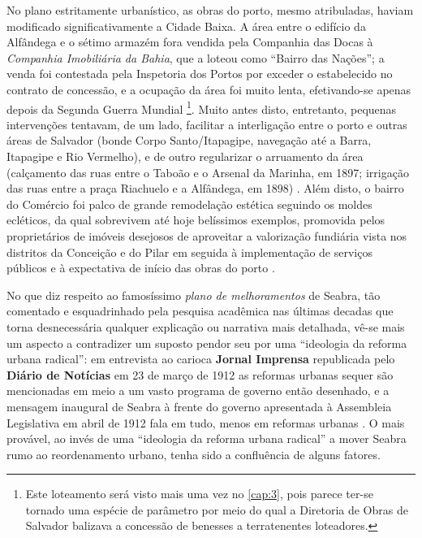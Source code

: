 No plano estritamente urbanístico, as obras do porto, mesmo atribuladas, haviam modificado significativamente a Cidade Baixa. A área entre o edifício da Alfândega e o sétimo armazém fora vendida pela Companhia das Docas à \textit{Companhia Imobiliária da Bahia}, que a loteou como ``Bairro das Nações''; a venda foi contestada pela Inspetoria dos Portos por exceder o estabelecido no contrato de concessão, e a ocupação da área foi muito lenta, efetivando-se apenas depois da Segunda Guerra Mundial \cite[p.~205-206]{almeida_vitrinescomercio_2014}\footnote{Este loteamento será visto mais uma vez no \autoref{cap:3}, pois parece ter-se tornado uma espécie de parâmetro por meio do qual a Diretoria de Obras de Salvador balizava a concessão de benesses a terratenentes loteadores.}. Muito antes disto, entretanto, pequenas intervenções tentavam, de um lado, facilitar a interligação entre o porto e outras áreas de Salvador (bonde Corpo Santo/Itapagipe, navegação até a Barra, Itapagipe e Rio Vermelho), e de outro regularizar o arruamento da área (calçamento das ruas entre o Taboão e o Arsenal da Marinha, em 1897; irrigação das ruas entre a praça Riachuelo e a Alfândega, em 1898) \cite[p.~208-209]{almeida_vitrinescomercio_2014}. Além disto, o bairro do Comércio foi palco de grande remodelação estética seguindo os moldes ecléticos, da qual sobrevivem até hoje belíssimos exemplos, promovida pelos proprietários de imóveis desejosos de aproveitar a valorização fundiária vista nos distritos da Conceição e do Pilar em seguida à implementação de serviços públicos e à expectativa de início das obras do porto \cite[p.~251-304]{almeida_vitrinescomercio_2014}.

No que diz respeito ao famosíssimo \textit{plano de melhoramentos} de Seabra, tão comentado e esquadrinhado pela pesquisa acadêmica nas últimas decadas que torna desnecessária qualquer explicação ou narrativa mais detalhada, vê-se mais um aspecto a contradizer um suposto pendor seu por uma ``ideologia da reforma urbana radical'': em entrevista ao carioca \textbf{Jornal Imprensa} republicada pelo \textbf{Diário de Notícias} em 23 de março de 1912 as reformas urbanas sequer são mencionadas em meio a um vasto programa de governo então desenhado, e a mensagem inaugural de Seabra à frente do governo apresentada à Assembleia Legislativa em abril de 1912 fala em tudo, menos em reformas urbanas \cite[pp.~92-94]{CUNHA2011}. O mais provável, ao invés de uma ``ideologia da reforma urbana radical'' a mover Seabra rumo ao reordenamento urbano, tenha sido a confluência de alguns fatores.

